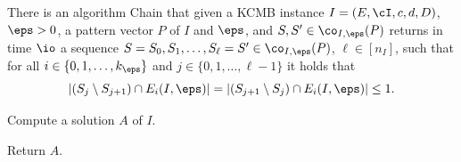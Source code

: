 \begin{lemma}
	\label{lem:chain}
	There is an algorithm \textnormal{\textsf{Chain}} that given a \textnormal{KCMB} instance $I =  (E,\cI,c,d,D)$, $\eps>0$, a pattern vector $P$ of $I$ and $\eps$, and $S,S' \in \co_{I,\eps}(P)$ returns in time $\io$ a sequence $S = S_0, S_1, \ldots, S_{\ell} = S' \in \co_{I,\eps}(P)$, $\ell \in [n_I]$, such that for all $i \in \{0,1,\ldots,k_{\eps}\}$ and $j \in \{0,1,\ldots,\ell-1\}$ it holds that \begin{equation*}
		\label{eq:lem} 
		\left|  (S_j \setminus S_{j+1}) \cap E_i(I,\eps) \right|  = \left|  (S_{j+1} \setminus S_{j}) \cap E_i(I,\eps) \right| \leq 1.
	\end{equation*} %
	
\end{lemma}




\begin{algorithm}[h]
	\caption{$\textsf{EPTAS}(I = (E, \cI, c,d, D),\eps)$}
	\label{alg:findRep}
	
%

%	

%	


%

Compute a solution $A$ of $I$. 


Return $A$.\label{step:REPret}
\end{algorithm}

